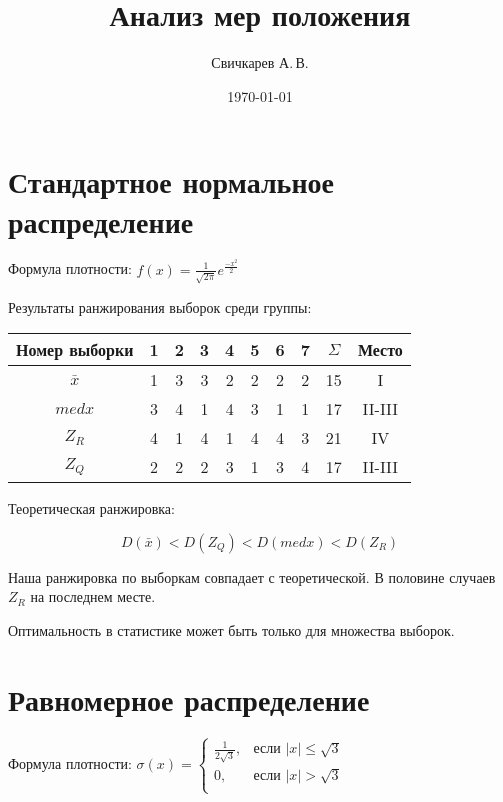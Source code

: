 \documentclass{article} %
\title{Анализ мер положения} %
\author{Свичкарев А.\,В.} %
\date{\today} %
\begin{document}

\maketitle %

\section{Стандартное нормальное распределение}

Формула плотности:
\( f(x) = \frac{1}{\sqrt{ 2\pi }}e^{\frac{-x^2}{2}} \)


Результаты ранжирования выборок среди группы:
\begin{center}
	\begin{tabular}{|c| c|c|c|c|c|c|c| c|c|} \hline
		Номер выборки & 1 & 2 & 3 & 4 & 5 & 6 & 7 & \(\Sigma\) & Место \\ \hline
		\(\bar{x}\)   & 1 & 3 & 3 & 2 & 2 & 2 & 2 & 15 & I \\ \hline
		\(medx\)      & 3 & 4 & 1 & 4 & 3 & 1 & 1 & 17 & II-III \\ \hline
		\(Z_R\)       & 4 & 1 & 4 & 1 & 4 & 4 & 3 & 21 & IV \\ \hline
		\(Z_Q\)       & 2 & 2 & 2 & 3 & 1 & 3 & 4 & 17 & II-III \\ \hline
	\end{tabular}
\end{center}

Теоретическая ранжировка:

\[ D(\bar{x}) < D(Z_Q) < D(medx) < D(Z_R) \]

Наша ранжировка по выборкам совпадает с теоретической. В половине случаев \(Z_R\) на последнем месте.

Оптимальность в статистике может быть только для множества выборок.

\section{Равномерное распределение}
Формула плотности:
\( \sigma(x) = \left\{
	\begin{array}{cl}
		\frac{1}{2\sqrt{3}}, & \mbox{если } \lvert x \rvert \leq \sqrt{3} \\
		0, & \mbox{если } \lvert x \rvert > \sqrt{3}  \\
\end{array} \right. \)
\end{document}
